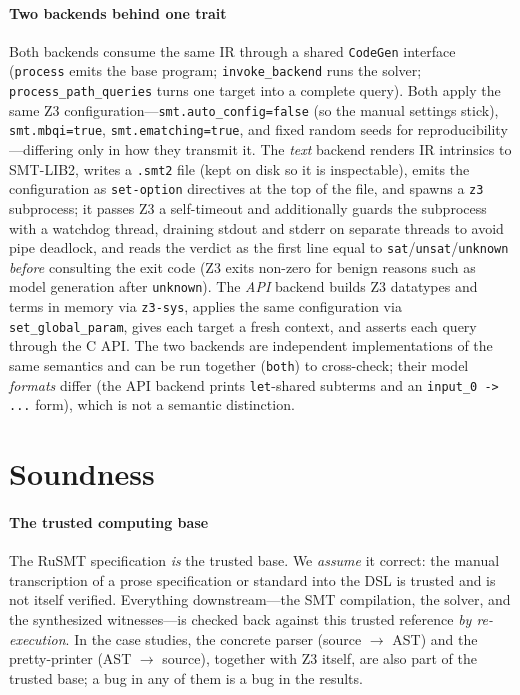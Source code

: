 \documentclass[sigplan,review,anonymous]{acmart}
\theoremstyle{definition}
\theoremstyle{remark}
\newcommand{\rusmt}{RuSMT}
\newcommand{\code}[1]{\texttt{#1}}
\begin{document}
\paragraph{Two backends behind one trait}
Both backends consume the same IR through a shared \code{CodeGen} interface
(\code{process} emits the base program; \code{invoke\_backend} runs the solver;
\code{process\_path\_queries} turns one target into a complete query). Both apply
the same Z3 configuration---\code{smt.auto\_config=false} (so the manual settings
stick), \code{smt.mbqi=true}, \code{smt.ematching=true}, and fixed random seeds
for reproducibility---differing only in how they transmit it. The \emph{text}
backend renders IR intrinsics to SMT-LIB2, writes a \code{.smt2} file (kept on
disk so it is inspectable), emits the configuration as \code{set-option}
directives at the top of the file, and spawns a \code{z3} subprocess; it passes
Z3 a self-timeout and additionally guards the subprocess with a watchdog thread,
draining stdout and stderr on separate threads to avoid pipe deadlock, and reads
the verdict as the first line equal to \code{sat}/\code{unsat}/\code{unknown}
\emph{before} consulting the exit code (Z3 exits non-zero for benign reasons such
as model generation after \code{unknown}). The \emph{API} backend builds Z3
datatypes and terms in memory via \code{z3-sys}, applies the same configuration
via \code{set\_global\_param}, gives each target a fresh context, and asserts each
query through the C API. The two backends are independent implementations of the
same semantics and can be run together (\code{both}) to cross-check; their model
\emph{formats} differ (the API backend prints \code{let}-shared subterms and an
\code{input\_0 -> ...} form), which is not a semantic distinction.

\section{Soundness}
\label{sec:soundness}

\paragraph{The trusted computing base}
The \rusmt{} specification \emph{is} the trusted base. We \emph{assume} it
correct: the manual transcription of a prose specification or standard into the
DSL is trusted and is not itself verified. Everything downstream---the SMT
compilation, the solver, and the synthesized witnesses---is checked back against
this trusted reference \emph{by re-execution}. In the case studies, the concrete
parser (source $\to$ AST) and the pretty-printer (AST $\to$ source), together
with Z3 itself, are also part of the trusted base; a bug in any of them is a bug
in the results.
\end{document}
